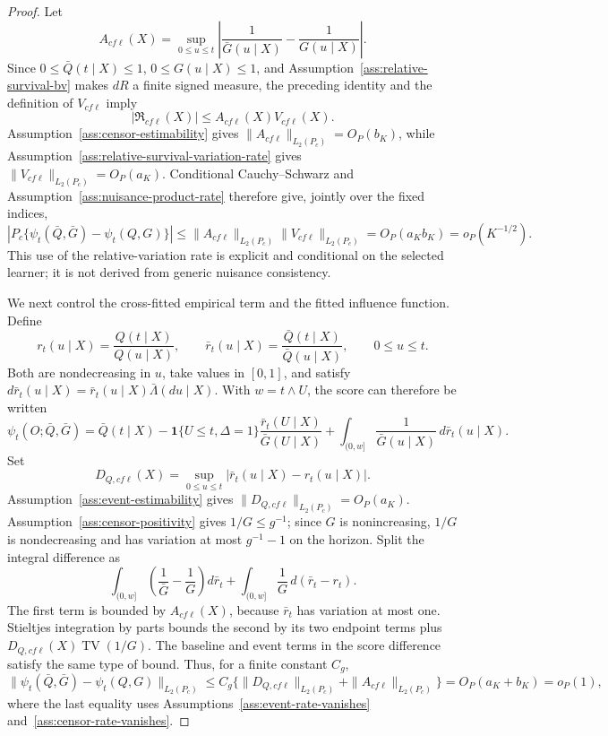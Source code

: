 \documentclass{article}
\begin{document}
\begin{proof}
Let
\[
 A_{cf\ell}(X)=\sup_{0\le u\le t}
 \left|\frac1{\bar G(u\mid X)}-\frac1{G(u\mid X)}\right|.
\]
Since \(0\le\bar Q(t\mid X)\le1\), \(0\le G(u\mid X)\le1\), and Assumption~\ref{ass:relative-survival-bv} makes \(dR\) a finite signed measure, the preceding identity and the definition of \(V_{cf\ell}\) imply
\[
 |\mathfrak R_{cf\ell}(X)|\le A_{cf\ell}(X)V_{cf\ell}(X).
\]
Assumption~\ref{ass:censor-estimability} gives \(\|A_{cf\ell}\|_{L_2(P_c)}=O_P(b_K)\), while Assumption~\ref{ass:relative-survival-variation-rate} gives \(\|V_{cf\ell}\|_{L_2(P_c)}=O_P(a_K)\). Conditional Cauchy--Schwarz and Assumption~\ref{ass:nuisance-product-rate} therefore give, jointly over the fixed indices,
\[
 \left|P_c\{\psi_t(\bar Q,\bar G)-\psi_t(Q,G)\}\right|
 \le\|A_{cf\ell}\|_{L_2(P_c)}\|V_{cf\ell}\|_{L_2(P_c)}
 =O_P(a_Kb_K)=o_P(K^{-1/2}).
\]
This use of the relative-variation rate is explicit and conditional on the selected learner; it is not derived from generic nuisance consistency.

We next control the cross-fitted empirical term and the fitted influence function. Define
\[
 r_t(u\mid X)=\frac{Q(t\mid X)}{Q(u\mid X)},
 \qquad
 \bar r_t(u\mid X)=\frac{\bar Q(t\mid X)}{\bar Q(u\mid X)},
 \qquad 0\le u\le t.
\]
Both are nondecreasing in \(u\), take values in \([0,1]\), and satisfy
\(d\bar r_t(u\mid X)=\bar r_t(u\mid X)\bar\Lambda(du\mid X)\). With \(w=t\wedge U\), the score can therefore be written
\[
 \psi_t(O;\bar Q,\bar G)
 =\bar Q(t\mid X)
 -\mathbf 1\{U\le t,\Delta=1\}\frac{\bar r_t(U\mid X)}{\bar G(U\mid X)}
 +\int_{(0,w]}\frac1{\bar G(u\mid X)}\,d\bar r_t(u\mid X).
\]
Set
\[
 D_{Q,cf\ell}(X)=\sup_{0\le u\le t}
 |\bar r_t(u\mid X)-r_t(u\mid X)|.
\]
Assumption~\ref{ass:event-estimability} gives \(\|D_{Q,cf\ell}\|_{L_2(P_c)}=O_P(a_K)\). Assumption~\ref{ass:censor-positivity} gives \(1/G\le g^{-1}\); since \(G\) is nonincreasing, \(1/G\) is nondecreasing and has variation at most \(g^{-1}-1\) on the horizon. Split the integral difference as
\[
 \int_{(0,w]}\left(\frac1{\bar G}-\frac1G\right)d\bar r_t
 +\int_{(0,w]}\frac1G\,d(\bar r_t-r_t).
\]
The first term is bounded by \(A_{cf\ell}(X)\), because \(\bar r_t\) has variation at most one. Stieltjes integration by parts bounds the second by its two endpoint terms plus
\(D_{Q,cf\ell}(X)\operatorname{TV}(1/G)\). The baseline and event terms in the score difference satisfy the same type of bound. Thus, for a finite constant \(C_g\),
\[
 \|\psi_t(\bar Q,\bar G)-\psi_t(Q,G)\|_{L_2(P_c)}
 \le C_g\{\|D_{Q,cf\ell}\|_{L_2(P_c)}+\|A_{cf\ell}\|_{L_2(P_c)}\}
 =O_P(a_K+b_K)=o_P(1),
\]
where the last equality uses Assumptions~\ref{ass:event-rate-vanishes} and~\ref{ass:censor-rate-vanishes}.


\end{proof}
\end{document}
